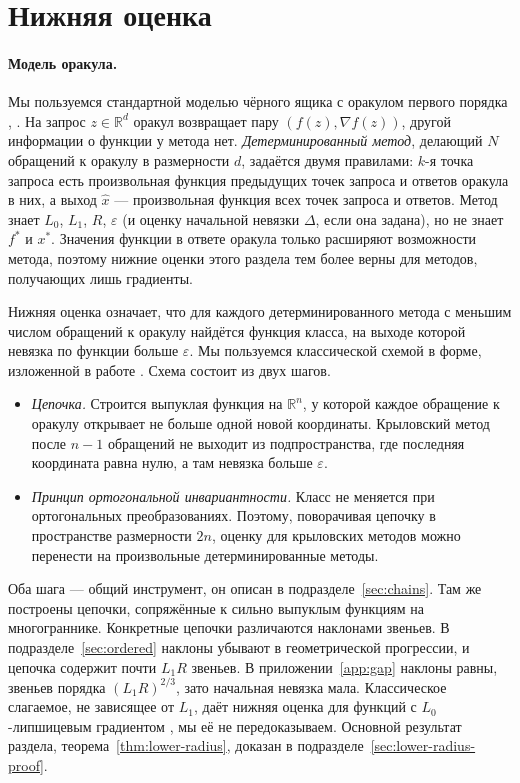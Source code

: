 \documentclass[11pt,a4paper]{article}
\newcommand{\R}{\mathbb R}
\begin{document}
\section{Нижняя оценка}\label{sec:lower}

\paragraph{Модель оракула.} Мы пользуемся стандартной моделью чёрного ящика с оракулом первого порядка \citep{nemirovski1983problem}, \citep[§1.1.2]{nesterov2018lectures}. На запрос $z\in\R^d$ оракул возвращает пару $(f(z),\nabla f(z))$, другой информации о функции у метода нет. \emph{Детерминированный метод}, делающий $N$ обращений к оракулу в размерности $d$, задаётся двумя правилами: $k$-я точка запроса есть произвольная функция предыдущих точек запроса и ответов оракула в них, а выход $\hat x$ --- произвольная функция всех точек запроса и ответов. Метод знает $L_0$, $L_1$, $R$, $\varepsilon$ (и оценку начальной невязки $\Delta$, если она задана), но не знает $f^\ast$ и $x^\ast$. Значения функции в ответе оракула только расширяют возможности метода, поэтому нижние оценки этого раздела тем более верны для методов, получающих лишь градиенты.

Нижняя оценка означает, что для каждого детерминированного метода с меньшим числом обращений к оракулу найдётся функция класса, на выходе которой невязка по функции больше $\varepsilon$. Мы пользуемся классической схемой \citet{nemirovski1983problem} в форме, изложенной в работе \citet{carmon2020lower}. Схема состоит из двух шагов.
\begin{itemize}
\item \emph{Цепочка.} Строится выпуклая функция на $\R^n$, у которой каждое обращение к оракулу открывает не больше одной новой координаты. Крыловский метод после $n-1$ обращений не выходит из подпространства, где последняя координата равна нулю, а там невязка больше $\varepsilon$.
\item \emph{Принцип ортогональной инвариантности.} Класс не меняется при ортогональных преобразованиях. Поэтому, поворачивая цепочку в пространстве размерности $2n$, оценку для крыловских методов можно перенести на произвольные детерминированные методы.
\end{itemize}
Оба шага --- общий инструмент, он описан в подразделе~\ref{sec:chains}. Там же построены цепочки, сопряжённые к сильно выпуклым функциям на многограннике. Конкретные цепочки различаются наклонами звеньев. В подразделе~\ref{sec:ordered} наклоны убывают в геометрической прогрессии, и цепочка содержит почти $L_1R$ звеньев. В приложении~\ref{app:gap} наклоны равны, звеньев порядка $(L_1R)^{2/3}$, зато начальная невязка мала. Классическое слагаемое, не зависящее от $L_1$, даёт нижняя оценка для функций с $L_0$-липшицевым градиентом \citep[теорема~2.1.7]{nesterov2018lectures}, мы её не передоказываем. Основной результат раздела, теорема~\ref{thm:lower-radius}, доказан в подразделе~\ref{sec:lower-radius-proof}.
\end{document}
